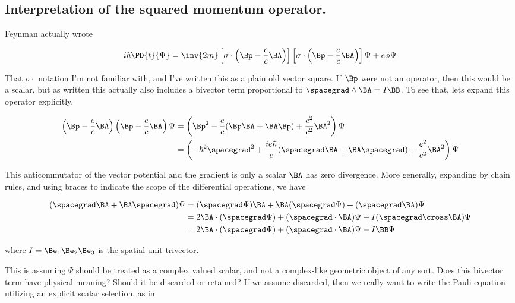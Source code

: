 \subsection{Interpretation of the squared momentum operator.}

Feynman actually wrote

\begin{align}\label{eqn:pauliFourier:1f}
i \hbar \PD{t}{\Psi} = \inv{2m} 
\left[\sigma \cdot \left( \Bp - \frac{e}{c} \BA \right)\right]
\left[\sigma \cdot \left( \Bp - \frac{e}{c} \BA \right)\right]
 \Psi + e \phi \Psi
\end{align}

That $\sigma \cdot$ notation I'm not familiar with, and I've written this as a plain old vector square.  If $\Bp$ were not an operator, then this would be a scalar, but as written this actually also includes a bivector term proportional to $\spacegrad \wedge \BA = I \BB$.  To see that, lets expand this operator explicitly.

\begin{align*}
\left( \Bp - \frac{e}{c} \BA \right) \left( \Bp - \frac{e}{c} \BA \right) \Psi 
&=
\left( \Bp^2 - \frac{e}{c} ( \Bp \BA + \BA \Bp ) + \frac{e^2}{c^2} \BA^2 \right) \Psi \\
&=
\left( - \hbar^2 \spacegrad^2 + \frac{i e \hbar }{c} ( \spacegrad \BA + \BA \spacegrad ) + \frac{e^2}{c^2} \BA^2 \right) \Psi \\
\end{align*}

This anticommutator of the vector potential and the gradient is only a scalar $\BA $ has zero divergence.  More generally, expanding by chain rules, and using braces to indicate the scope of the differential operations, we have

\begin{align*}
( \spacegrad \BA + \BA \spacegrad ) \Psi
&=
(\spacegrad \Psi) \BA + \BA (\spacegrad \Psi) + (\spacegrad \BA) \Psi \\
&=
2 \BA \cdot (\spacegrad \Psi) + (\spacegrad \cdot \BA) \Psi + I (\spacegrad \cross \BA) \Psi \\
&=
2 \BA \cdot (\spacegrad \Psi) + (\spacegrad \cdot \BA) \Psi + I \BB \Psi \\
\end{align*}

where $I = \Be_1 \Be_2 \Be_3$ is the spatial unit trivector.

This is assuming $\Psi$ should be treated as a complex valued scalar, and not a complex-like geometric object of any sort.  Does this bivector term have physical meaning?  Should it be discarded or retained?  If we assume discarded, then we really want to write the Pauli equation utilizing an explicit scalar selection, as in

